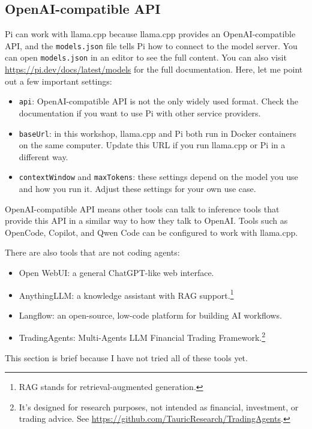 \documentclass[a4paper,12pt]{article}
\begin{document}
\subsection{OpenAI-compatible API}
\label{sec:api}

Pi can work with llama.cpp because llama.cpp provides an OpenAI-compatible API, and the \texttt{models.json} file tells Pi how to connect to the model server. You can open \texttt{models.json} in an editor to see the full content. You can also visit \url{https://pi.dev/docs/latest/models} for the full documentation. Here, let me point out a few important settings:

\begin{itemize}
\item \texttt{api}: OpenAI-compatible API is not the only widely used format. Check the documentation if you want to use Pi with other service providers.
\item \texttt{baseUrl}: in this workshop, llama.cpp and Pi both run in Docker containers on the same computer. Update this URL if you run llama.cpp or Pi in a different way.
\item \texttt{contextWindow} and \texttt{maxTokens}: these settings depend on the model you use and how you run it. Adjust these settings for your own use case.
\end{itemize}

OpenAI-compatible API means other tools can talk to inference tools that provide this API in a similar way to how they talk to OpenAI. Tools such as OpenCode, Copilot, and Qwen Code can be configured to work with llama.cpp.

There are also tools that are not coding agents:

\begin{itemize}
\item Open WebUI: a general ChatGPT-like web interface.
\item AnythingLLM: a knowledge assistant with RAG support.\footnote{RAG stands for retrieval-augmented generation.}
\item Langflow: an open-source, low-code platform for building AI workflows.
\item TradingAgents: Multi-Agents LLM Financial Trading Framework.\footnote{It's designed for research purposes, not intended as financial, investment, or trading advice. See \url{https://github.com/TauricResearch/TradingAgents}.}
\end{itemize}

This section is brief because I have not tried all of these tools yet.
\end{document}
